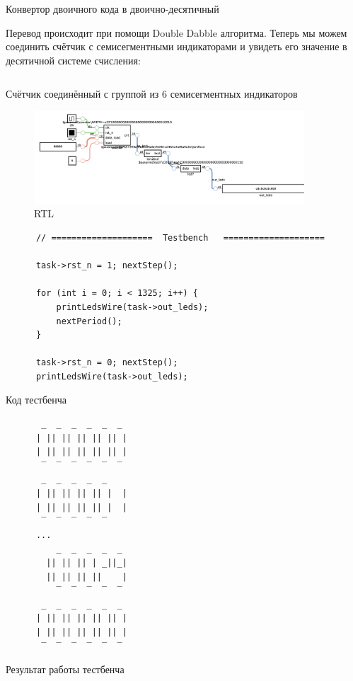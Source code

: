 \documentclass[a4paper]{article}
\begin{document}
  \begin{listing}[H]
    \inputminted{verilog}{../chapter_6/bin2bcd.v}
    \caption{Конвертор двоичного кода в двоично-десятичный}
  \end{listing}

  Перевод происходит при помощи Double Dabble алгоритма.
  Теперь мы можем соединить счётчик с семисегментными индикаторами и увидеть
  его значение в десятичной системе счисления:
  
  \begin{listing}[H]
    \inputminted{verilog}{../chapter_6/extra/1/task1.v}
    \caption{Счётчик соединённый с группой из 6 семисегментных индикаторов}
  \end{listing}

  \begin{figure}[H]
    \centering
    \includegraphics[width=0.9\textwidth]{lab_323.png}
    \caption{RTL}
  \end{figure}

  \begin{listing}[H]
    \begin{verbatim}
      // ====================  Testbench   ====================

      task->rst_n = 1; nextStep();

      for (int i = 0; i < 1325; i++) {
          printLedsWire(task->out_leds);
          nextPeriod();
      }

      task->rst_n = 0; nextStep();
      printLedsWire(task->out_leds);
    \end{verbatim}
    \caption{Код тестбенча}
  \end{listing}

  \begin{listing}[H]
    \begin{verbatim}
       _  _  _  _  _  _ 
      | || || || || || |
      | || || || || || |
       ‾  ‾  ‾  ‾  ‾  ‾ 
       _  _  _  _  _    
      | || || || || |  |
      | || || || || |  |
       ‾  ‾  ‾  ‾  ‾    
      ...
          _  _  _  _  _ 
        || || || | _||_|
        || || || ||    |
          ‾  ‾  ‾  ‾  ‾ 
       _  _  _  _  _  _ 
      | || || || || || |
      | || || || || || |
       ‾  ‾  ‾  ‾  ‾  ‾ 
    \end{verbatim}
    \caption{Результат работы тестбенча}
  \end{listing}
\end{document}
